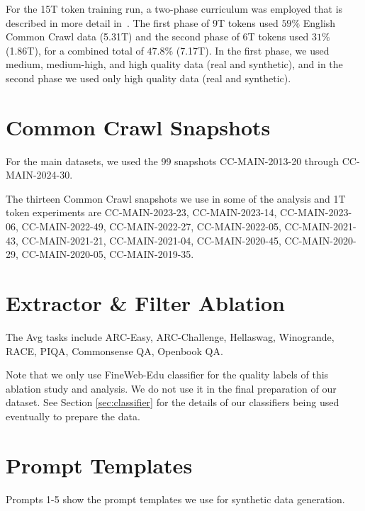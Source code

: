 \documentclass[11pt]{article}
\begin{document}
For the 15T token training run, a two-phase curriculum was employed that is described in more detail in~\citet{feng2024maximizedataspotentialenhancing}. The first phase of 9T tokens used $59\%$ English Common Crawl data (5.31T) and the second phase of 6T tokens used $31\%$ (1.86T), for a combined total of $47.8\%$ (7.17T). In the first phase, we used medium, medium-high, and high quality data (real and synthetic), and in the second phase we used only high quality data (real and synthetic).

\section{Common Crawl Snapshots} \label{sec:13_snapshots}

For the main datasets, we used the 99 snapshots CC-MAIN-2013-20 through CC-MAIN-2024-30.

The thirteen Common Crawl snapshots we use in some of the analysis and 1T token experiments are 
CC-MAIN-2023-23,     CC-MAIN-2023-14,     CC-MAIN-2023-06,     CC-MAIN-2022-49,     CC-MAIN-2022-27,     CC-MAIN-2022-05,     CC-MAIN-2021-43,     CC-MAIN-2021-21,     CC-MAIN-2021-04,     CC-MAIN-2020-45,     CC-MAIN-2020-29,     CC-MAIN-2020-05,     CC-MAIN-2019-35.

\section{Extractor \& Filter Ablation} \label{sec:non_mmlu}

The Avg tasks include ARC-Easy, ARC-Challenge, Hellaswag, Winogrande, RACE, PIQA, Commonsense QA, Openbook QA. 

Note that we only use FineWeb-Edu classifier for the quality labels of this ablation study and analysis. We do not use it in the final preparation of our dataset. See Section \ref{sec:classifier} for the details of our classifiers being used eventually to prepare the data.

\section{Prompt Templates}
\label{sec:appendix-prompt-templates}

Prompts 1-5 show the prompt templates we use for synthetic data generation.
\end{document}
